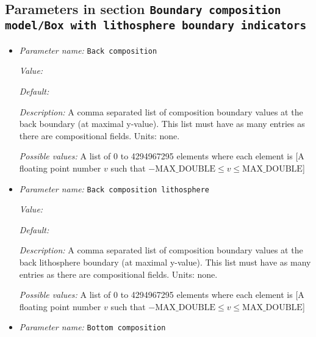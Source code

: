 \subsection{Parameters in section \tt Boundary composition model/Box with lithosphere boundary indicators}
\label{parameters:Boundary_20composition_20model/Box_20with_20lithosphere_20boundary_20indicators}

\begin{itemize}
\item {\it Parameter name:} {\tt Back composition}
\label{parameters:Boundary composition model/Box with lithosphere boundary indicators/Back composition}
\label{parameters:Boundary_20composition_20model/Box_20with_20lithosphere_20boundary_20indicators/Back_20composition}


{\it Value:} 


{\it Default:} 


{\it Description:} A comma separated list of composition boundary values at the back boundary (at maximal y-value). This list must have as many entries as there are compositional fields. Units: none.


{\it Possible values:} A list of 0 to 4294967295 elements where each element is [A floating point number $v$ such that $-\text{MAX\_DOUBLE} \leq v \leq \text{MAX\_DOUBLE}$]
\item {\it Parameter name:} {\tt Back composition lithosphere}
\label{parameters:Boundary composition model/Box with lithosphere boundary indicators/Back composition lithosphere}
\label{parameters:Boundary_20composition_20model/Box_20with_20lithosphere_20boundary_20indicators/Back_20composition_20lithosphere}


{\it Value:} 


{\it Default:} 


{\it Description:} A comma separated list of composition boundary values at the back lithosphere boundary (at maximal y-value). This list must have as many entries as there are compositional fields. Units: none.


{\it Possible values:} A list of 0 to 4294967295 elements where each element is [A floating point number $v$ such that $-\text{MAX\_DOUBLE} \leq v \leq \text{MAX\_DOUBLE}$]
\item {\it Parameter name:} {\tt Bottom composition}
\label{parameters:Boundary composition model/Box with lithosphere boundary indicators/Bottom composition}
\label{parameters:Boundary_20composition_20model/Box_20with_20lithosphere_20boundary_20indicators/Bottom_20composition}



\end{itemize}
